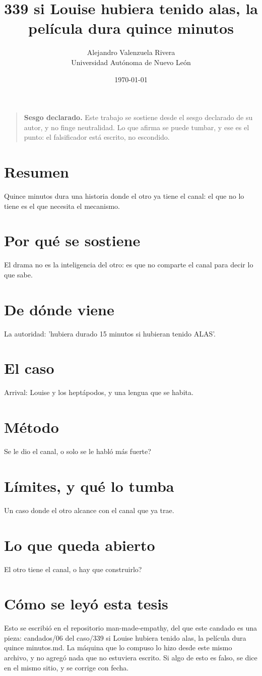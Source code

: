 \documentclass[11pt,a4paper]{article}
\title{339 si Louise hubiera tenido alas, la película dura quince minutos}
\author{Alejandro Valenzuela Rivera\\\small Universidad Autónoma de Nuevo León}
\date{\today}
\begin{document}
\maketitle

\begin{quote}
\textbf{Sesgo declarado.} Este trabajo se sostiene desde el sesgo declarado de su autor, y no finge neutralidad. Lo que afirma se puede tumbar, y ese es el punto: el falsificador está escrito, no escondido.
\end{quote}

\section*{Resumen}
Quince minutos dura una historia donde el otro ya tiene el canal: el que no lo tiene es el que necesita el mecanismo.

\section{Por qué se sostiene}
El drama no es la inteligencia del otro: es que no comparte el canal para decir lo que sabe.

\section{De dónde viene}
La autoridad: 'hubiera durado 15 minutos si hubieran tenido ALAS'.

\section{El caso}
Arrival: Louise y los heptápodos, y una lengua que se habita.

\section{Método}
\textquestiondown{}Se le dio el canal, o solo se le habló más fuerte?

\section{Límites, y qué lo tumba}
Un caso donde el otro alcance con el canal que ya trae.

\section{Lo que queda abierto}
\textquestiondown{}El otro tiene el canal, o hay que construirlo?

\section*{Cómo se leyó esta tesis}
Esto se escribió en el repositorio man-made-empathy, del que este candado es una pieza: candados/06 del caso/339 si Louise hubiera tenido alas, la película dura quince minutos.md. La máquina que lo compuso lo hizo desde este mismo archivo, y no agregó nada que no estuviera escrito. Si algo de esto es falso, se dice en el mismo sitio, y se corrige con fecha.
\end{document}
